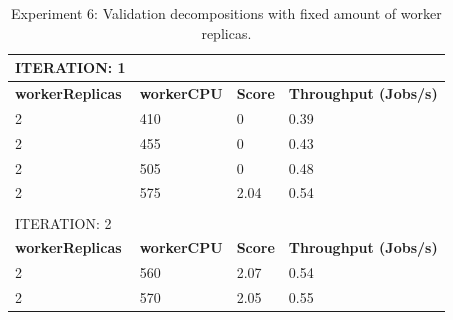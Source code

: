 \begin{table}[H]
\centering
\caption{Experiment 6: Validation decompositions with fixed amount of worker replicas.  }
\label{tbl:exp6-val}
\begin{tabular}{llll}
ITERATION: 1                                  &                                         &                                     &                                                  \\ \hline
\multicolumn{1}{|l|}{\textbf{workerReplicas}} & \multicolumn{1}{l|}{\textbf{workerCPU}} & \multicolumn{1}{l|}{\textbf{Score}} & \multicolumn{1}{l|}{\textbf{Throughput (Jobs/s)}} \\ \hline
\multicolumn{1}{|l|}{2}                       & \multicolumn{1}{l|}{410}                & \multicolumn{1}{l|}{0}              & \multicolumn{1}{l|}{0.39}                        \\ \hline
\multicolumn{1}{|l|}{2}                       & \multicolumn{1}{l|}{455}                & \multicolumn{1}{l|}{0}              & \multicolumn{1}{l|}{0.43}                        \\ \hline
\multicolumn{1}{|l|}{2}                       & \multicolumn{1}{l|}{505}                & \multicolumn{1}{l|}{0}              & \multicolumn{1}{l|}{0.48}                        \\ \hline
\multicolumn{1}{|l|}{2}                       & \multicolumn{1}{l|}{575}                & \multicolumn{1}{l|}{2.04}           & \multicolumn{1}{l|}{0.54}                        \\ \hline
                                              &                                         &                                     &                                                  \\
ITERATION: 2                                  &                                         &                                     &                                                  \\ \hline
\multicolumn{1}{|l|}{\textbf{workerReplicas}} & \multicolumn{1}{l|}{\textbf{workerCPU}} & \multicolumn{1}{l|}{\textbf{Score}} & \multicolumn{1}{l|}{\textbf{Throughput (Jobs/s)}} \\ \hline
\multicolumn{1}{|l|}{2}                       & \multicolumn{1}{l|}{560}                & \multicolumn{1}{l|}{2.07}           & \multicolumn{1}{l|}{0.54}                        \\ \hline
\multicolumn{1}{|l|}{2}                       & \multicolumn{1}{l|}{570}                & \multicolumn{1}{l|}{2.05}           & \multicolumn{1}{l|}{0.55}                        \\ \hline

\end{tabular}
\end{table}
